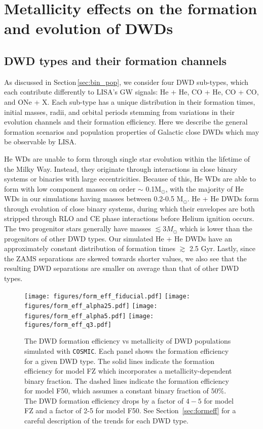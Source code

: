 \documentclass[twocolumn, linenumbers]{aastex631}
\newcommand{\cosmic}{\texttt{COSMIC}}
\begin{document}
\section{Metallicity effects on the formation and evolution of DWDs}\label{sec:results}

\subsection{DWD types and their formation channels}\label{sec:ini}
As discussed in Section\,\ref{sec:bin_pop}, we consider four DWD sub-types, which each contribute differently to LISA's GW signals: He + He, CO + He, CO + CO, and ONe + X. Each sub-type has a unique distribution in their formation times, initial masses, radii, and orbital periods stemming from variations in their evolution channels and their formation efficiency. Here we describe the general formation scenarios and population properties of Galactic close DWDs which may be observable by LISA.

He WDs are unable to form through single star evolution within the lifetime of the Milky Way. Instead, they originate through interactions in close binary systems or binaries with large eccentricities. Because of this, He WDs are able to form with low component masses on order $\sim$ 0.1M$_\odot$, with the majority of He WDs in our simulations having masses between 0.2-0.5 M$_\odot$. He + He DWDs form through evolution of close binary systems, during which their envelopes are both stripped through RLO and CE phase interactions before Helium ignition occurs. The two progenitor stars generally have masses $\lesssim 3 M_\odot$ which is lower than the progenitors of other DWD types. Our simulated He + He DWDs have an approximately constant distribution of formation times $\gtrsim$ 2.5 Gyr. Lastly, since the ZAMS separations are skewed towards shorter values, we also see that the resulting DWD separations are smaller on average than that of other DWD types. 

\begin{figure*}
	\texttt{[image: figures/form\_eff\_fiducial.pdf]}
	\texttt{[image: figures/form\_eff\_alpha25.pdf]}
	\texttt{[image: figures/form\_eff\_alpha5.pdf]}
	\texttt{[image: figures/form\_eff\_q3.pdf]}
    \caption{The DWD formation efficiency vs metallicity of DWD populations simulated with \cosmic. Each panel shows the formation efficiency for a given DWD type. The solid lines indicate the formation efficiency for model FZ which incorporates a metallicity-dependent binary fraction. The dashed lines indicate the formation efficiency for model F50, which assumes a constant binary fraction of $50\%$. The DWD formation efficiency drops by a factor of $4-5$ for model FZ and a factor of 2-5 for model F50. See Section~\ref{sec:formeff} for a careful description of the trends for each DWD type.}
    \label{fig:form_eff}
\end{figure*}
\end{document}
